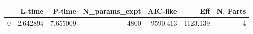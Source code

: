 \begin{tabular}{lrrrrrr}
\toprule
{} &    L-time &    P-time &  N\_params\_expt &  AIC-like &       Eff &  N. Parts \\
\midrule
0 &  2.642894 &  7.655009 &           4800 &  9590.413 &  1023.139 &         4 \\
\bottomrule
\end{tabular}
